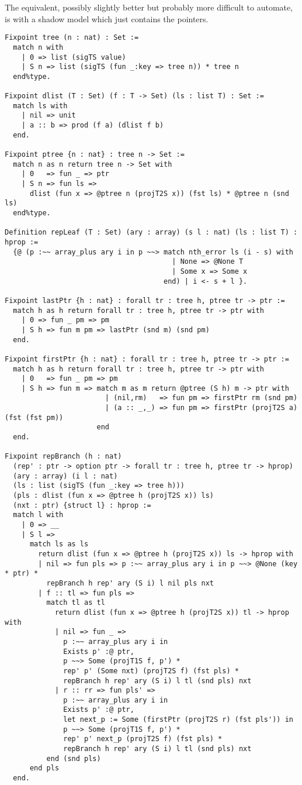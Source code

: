 \documentclass{article}
\begin{document}
\newpage
The equivalent, possibly slightly better but probably more difficult to automate, is with a shadow model which just contains the pointers.

\begin{lstlisting}
Fixpoint tree (n : nat) : Set :=
  match n with
    | 0 => list (sigTS value)
    | S n => list (sigTS (fun _:key => tree n)) * tree n
  end%type.

Fixpoint dlist (T : Set) (f : T -> Set) (ls : list T) : Set :=
  match ls with 
    | nil => unit
    | a :: b => prod (f a) (dlist f b)
  end.

Fixpoint ptree {n : nat} : tree n -> Set :=
  match n as n return tree n -> Set with
    | 0   => fun _ => ptr
    | S n => fun ls => 
      dlist (fun x => @ptree n (projT2S x)) (fst ls) * @ptree n (snd ls)
  end%type.

Definition repLeaf (T : Set) (ary : array) (s l : nat) (ls : list T) : hprop :=
  {@ (p :~~ array_plus ary i in p ~~> match nth_error ls (i - s) with
                                        | None => @None T
                                        | Some x => Some x
                                      end) | i <- s + l }.

Fixpoint lastPtr {h : nat} : forall tr : tree h, ptree tr -> ptr :=
  match h as h return forall tr : tree h, ptree tr -> ptr with
    | 0 => fun _ pm => pm
    | S h => fun m pm => lastPtr (snd m) (snd pm)
  end.

Fixpoint firstPtr {h : nat} : forall tr : tree h, ptree tr -> ptr :=
  match h as h return forall tr : tree h, ptree tr -> ptr with
    | 0   => fun _ pm => pm
    | S h => fun m => match m as m return @ptree (S h) m -> ptr with
                        | (nil,rm)   => fun pm => firstPtr rm (snd pm)
                        | (a :: _,_) => fun pm => firstPtr (projT2S a) (fst (fst pm))
                      end
  end.

Fixpoint repBranch (h : nat)
  (rep' : ptr -> option ptr -> forall tr : tree h, ptree tr -> hprop) 
  (ary : array) (i l : nat)
  (ls : list (sigTS (fun _:key => tree h)))
  (pls : dlist (fun x => @ptree h (projT2S x)) ls)
  (nxt : ptr) {struct l} : hprop :=
  match l with
    | 0 => __
    | S l => 
      match ls as ls 
        return dlist (fun x => @ptree h (projT2S x)) ls -> hprop with
        | nil => fun pls => p :~~ array_plus ary i in p ~~> @None (key * ptr) * 
          repBranch h rep' ary (S i) l nil pls nxt
        | f :: tl => fun pls =>
          match tl as tl 
            return dlist (fun x => @ptree h (projT2S x)) tl -> hprop  with
            | nil => fun _ =>
              p :~~ array_plus ary i in
              Exists p' :@ ptr,
              p ~~> Some (projT1S f, p') *
              rep' p' (Some nxt) (projT2S f) (fst pls) *
              repBranch h rep' ary (S i) l tl (snd pls) nxt
            | r :: rr => fun pls' => 
              p :~~ array_plus ary i in
              Exists p' :@ ptr,
              let next_p := Some (firstPtr (projT2S r) (fst pls')) in
              p ~~> Some (projT1S f, p') *
              rep' p' next_p (projT2S f) (fst pls) *
              repBranch h rep' ary (S i) l tl (snd pls) nxt
          end (snd pls)
      end pls
  end.


\end{lstlisting}
\end{document}
